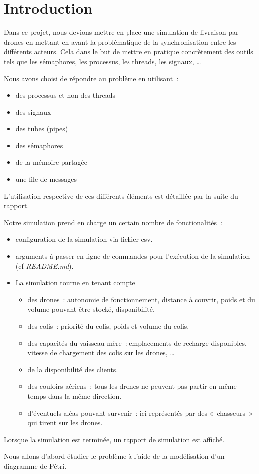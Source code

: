\section{Introduction}

Dans ce projet, nous devions mettre en place une simulation de livraison par drones en mettant en avant la problématique
de la synchronisation entre les différents acteurs. Cela dans le but de mettre en pratique concrètement des outils tels que
les sémaphores, les processus, les threads, les signaux, …

Nous avons choisi de répondre au problème en utilisant :
\begin{itemize}
    \item des processus et non des threads
    \item des signaux
    \item des tubes (pipes)
    \item des sémaphores
    \item de la mémoire partagée
    \item une file de messages
\end{itemize}

L'utilisation respective de ces différents éléments est détaillée par la suite du rapport.

Notre simulation prend en charge un certain nombre de fonctionalités :
\begin{itemize}
    \item configuration de la simulation via fichier csv.
    \item arguments à passer en ligne de commandes pour l'exécution de la simulation (cf \emph{README.md}).
    \item La simulation tourne en tenant compte
        \begin{itemize}
            \item des drones : autonomie de fonctionnement, distance à couvrir,
                poids et du volume pouvant être stocké, disponibilité.
            \item des colis : priorité du colis, poids et volume du colis.
            \item des capacités du vaisseau mère : emplacements de recharge disponibles,
                vitesse de chargement des colis sur les drones, …
            \item de la disponibilité des clients.
            \item des couloirs aériens : tous les drones ne peuvent pas partir en même temps dans la même direction.
            \item d'éventuels aléas pouvant survenir : ici représentés par des « chasseurs » qui tirent sur les drones.
        \end{itemize}
\end{itemize}

Lorsque la simulation est terminée, un rapport de simulation est affiché.

Nous allons d'abord étudier le problème à l'aide de la modélisation d'un diagramme de Pétri.

